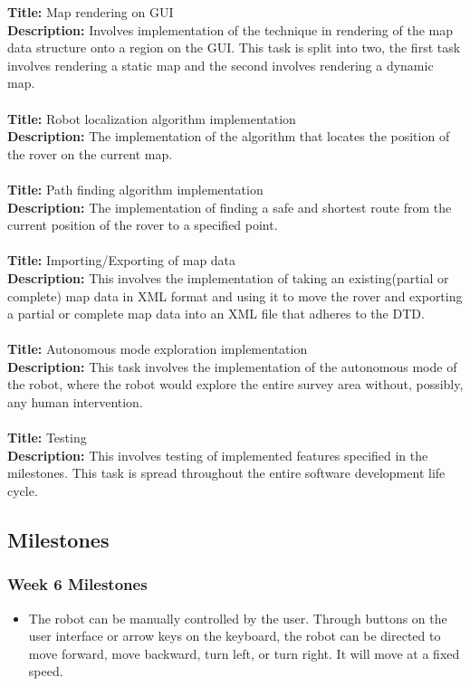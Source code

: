 \documentclass[12pt,a4paper]{article}
\begin{document}
	\textbf{Title: }Map rendering on GUI\\
	\textbf{Description: }Involves implementation of the technique in rendering of the map data structure onto a region on the GUI. This task is split into two, the first task involves rendering a static map and the second involves rendering a dynamic map.\\ \\
	\textbf{Title: }Robot localization algorithm implementation\\
	\textbf{Description: }The implementation of the algorithm that locates the position of the rover on the current map.\\ \\
	\textbf{Title: }Path finding algorithm implementation\\
	\textbf{Description: }The implementation of finding a safe and shortest route from the current position of the rover to a specified point.\\ \\
	\textbf{Title: }Importing/Exporting of map data\\
	\textbf{Description: }This involves the implementation of taking an existing(partial or complete) map data in XML format and using it to move the rover and exporting a partial or complete map data into an XML file that adheres to the DTD.\\ \\
	\textbf{Title: }Autonomous mode exploration implementation\\
	\textbf{Description: }This task involves the implementation of the autonomous mode of the robot, where the robot would explore the entire survey area without, possibly, any human intervention.\\ \\
	\textbf{Title: }Testing\\
	\textbf{Description: }This involves testing of implemented features specified in the milestones. This task is spread throughout the entire software development life cycle.\\
    
	\subsection{Milestones}
   	\subsubsection{Week 6 Milestones}
    \begin{itemize}
    	\item The robot can be manually controlled by the user. Through buttons on the user interface or arrow keys on the keyboard, the robot can be directed to move forward, move backward, turn left, or turn right. It will move at a fixed speed.
    \end{itemize}
\end{document}
